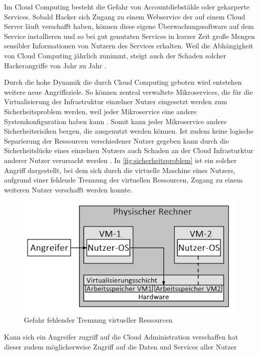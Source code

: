 Im Cloud Computing besteht die Gefahr von Accountdiebstähle oder gekarperte Services. 
Sobald Hacker sich Zugang zu einem Webservice der auf einem Cloud Server läuft verschafft haben, 
können diese eigene Überwachungssoftware auf dem Service installieren 
und so bei gut genutzten Services in kurzer Zeit große Mengen sensibler Informationen von Nutzern des Services erhalten.
Weil die Abhängigkeit von Cloud Computing jährlich zunimmt, 
steigt auch der Schaden solcher Hackerangriffe von Jahr zu Jahr \cite{jabbar2020}. 
 
Durch die hohe Dynamik die durch Cloud Computing geboten wird entstehen weitere neue Angriffsziele. So können zentral verwaltete Mikroservices, die für die Virtualisierung der Infrastruktur einzelner Nutzer eingesetzt werden zum Sicherheitsproblem werden, weil jeder Mikroservice eine andere Systemkonfiguration haben kann \cite{chen2019}. Somit kann jeder Mikroservice andere Sicherheitsrisiken bergen, die ausgenutzt werden können. Ist zudem keine logische Separierung der Ressourcen verschiedener Nutzer gegeben kann durch die Sicherheitslücke eines einzelnen Nutzers auch Schaden an der Cloud Infrasturktur anderer Nutzer verursacht werden \cite{wehrhahn-aklender2019}. In \autoref{fig:sicherheitsproblem} ist ein solcher Angriff dargestellt, bei dem sich durch die virtuelle Maschine eines Nutzers, aufgrund einer fehlende Trennung der virtuellen Ressourcen, Zugang zu einem weiteren Nutzer verschafft werden konnte. 

\begin{figure}[b]
	\centering
	\includegraphics[width=\linewidth]{images/sicherheitsproblemneu.png}	
	\caption{Gefahr fehlender Trennung virtueller Ressourcen \cite{wehrhahn-aklender2019}}
	\label{fig:sicherheitsproblem}
\end{figure}

 Kann sich ein Angreifer zugriff auf die Cloud Administration verschaffen hat dieser zudem möglicherweise Zugriff auf die Daten und Services aller Nutzer \cite{wehrhahn-aklender2019}

